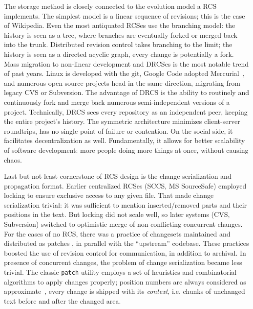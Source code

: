 \documentclass{sig-alternate}
\begin{document}
The storage method is closely connected to the evolution model a RCS implements.
The simplest model is a linear sequence of revisions; this is the case of Wikipedia.
Even the most antiquated RCSes use the branching model: the history is seen as a tree, where branches are eventually forked or merged back into the trunk.
Distributed revision control takes branching to the limit; the history is seen as a directed acyclic graph, every change is potentially a fork.
Mass migration to non-linear development and DRCSes is the most notable trend of past years.
Linux is developed with the git, Google Code adopted Mercurial~\cite{mercurial}, and numerous open source projects head in the same direction, migrating from legacy CVS or Subversion.
The advantage of DRCS is the ability to routinely and continuously fork and merge back numerous semi-independent versions of a project.
Technically, DRCS sees every repository as an independent peer, keeping the entire project's history. The symmetric architecture minimizes client-server roundtrips, has no single point of failure or contention.
On the social side, it facilitates decentralization as well.
Fundamentally, it allows for better scalability of software development: more people doing more things at once, without causing chaos.

Last but not least cornerstone of RCS design is the change serialization and propagation format.
Earlier centralized RCSes (SCCS, MS SourceSafe) employed locking to ensure exclusive access to any given file.
That made change serialization trivial: it was sufficient to mention inserted/removed parts and their positions in the text.
But locking did not scale well, so later systems (CVS, Subversion) switched to optimistic merge of non-conflicting concurrent changes.
For the cases of no RCS, there was a practice of changesets maintained and distributed as patches \cite{stdpatch}, in parallel with the ``upstream'' codebase.
These practices boosted the use of revision control for communication, in addition to archival. 
In presence of concurrent changes, the problem of change serialization became less trivial.
The classic \verb+patch+ utility employs a set of heuristics and combinatorial algorithms to apply changes properly; position numbers are always considered as approximate~\cite{patch,fraser}, every change is shipped with its \emph{context}, i.e. chunks of unchanged text before and after the changed area.
\end{document}
